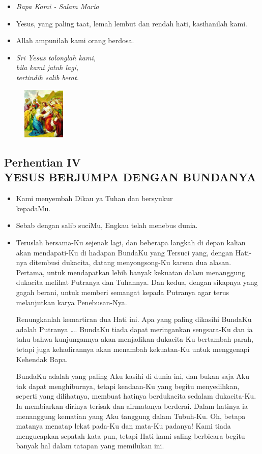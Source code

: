 \documentclass[a5paper,headsepline,titlepage,10pt,nnormalheadings,DIVcalc]{scrbook}
\newcommand{\BU}[1]{\begin{itemize} \item[U:] #1 \end{itemize}}
\newcommand{\BP}[1]{\begin{itemize} \item[P:] #1 \end{itemize}}
\newcommand{\kamiMenyembah}{\BP{ Kami menyembah Dikau ya Tuhan dan bersyukur\\kepadaMu.}
\BU{ Sebab dengan salib suciMu, Engkau telah menebus dunia.}
}
\newcommand{\kasihanilahKami}{\BP{Yesus, yang paling taat, lemah lembut dan rendah hati, kasihanilah kami.}
\BU{Allah ampunilah kami orang berdosa.}}
\begin{document}
\large\begin{itemize}\item[~]\it{Bapa Kami - Salam Maria}\end{itemize}\normalsize
\kasihanilahKami

\begin{itemize}
\item[4.] \it{Sri Yesus tolonglah kami, \\
	bila kami jatuh lagi,\\ 
	tertindih salib berat.}
\end{itemize}

\begin{figure}
\includegraphics[width=2cm]{jalansalib_files/04_small.jpg}
\end{figure}
\subsection*{Perhentian IV\\
YESUS BERJUMPA DENGAN BUNDANYA}

\kamiMenyembah
\BP{Teruslah bersama-Ku sejenak lagi, dan beberapa langkah di depan kalian akan mendapati-Ku di hadapan BundaKu yang Tersuci yang, dengan Hati-nya ditembusi dukacita, datang menyongsong-Ku karena dua alasan. Pertama, untuk mendapatkan lebih banyak kekuatan dalam menanggung dukacita melihat Putranya dan Tuhannya. Dan kedua, dengan sikapnya yang gagah berani, untuk memberi semangat kepada Putranya agar terus melanjutkan karya Penebusan-Nya.

Renungkanlah kemartiran dua Hati ini. Apa yang paling dikasihi BundaKu adalah Putranya \dots . BundaKu tiada dapat meringankan sengsara-Ku dan ia tahu bahwa kunjungannya akan menjadikan dukacita-Ku bertambah parah, tetapi juga kehadirannya akan menambah kekuatan-Ku untuk menggenapi Kehendak Bapa.

BundaKu adalah yang paling Aku kasihi di dunia ini, dan bukan saja Aku tak dapat menghiburnya, tetapi keadaan-Ku yang begitu menyedihkan, seperti yang dilihatnya, membuat hatinya berdukacita sedalam dukacita-Ku. Ia membiarkan dirinya terisak dan airmatanya berderai. Dalam hatinya ia menanggung kematian yang Aku tanggung dalam Tubuh-Ku. Oh, betapa matanya menatap lekat pada-Ku dan mata-Ku padanya! Kami tiada mengucapkan sepatah kata pun, tetapi Hati kami saling berbicara begitu banyak hal dalam tatapan yang memilukan ini.}
\end{document}
